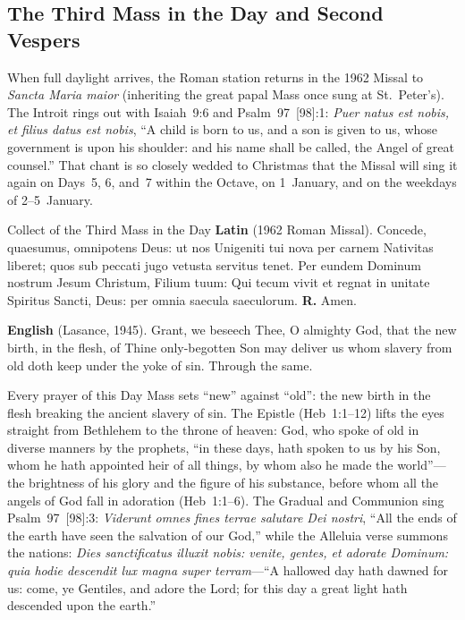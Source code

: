 \subsection{The Third Mass in the Day and Second Vespers}

When full daylight arrives, the Roman station returns in the 1962 Missal to
\textit{Sancta Maria maior} (inheriting the great papal Mass once sung at
St.~Peter's). The Introit rings out with Isaiah~9:6 and Psalm~97~[98]:1:
\textit{Puer natus est nobis, et filius datus est nobis}, ``A child is born to
us, and a son is given to us, whose government is upon his shoulder: and his
name shall be called, the Angel of great counsel.'' That chant is so closely
wedded to Christmas that the Missal will sing it again on Days~5, 6, and~7
within the Octave, on 1~January, and on the weekdays of 2--5~January.

\begin{massbox}{Collect of the Third Mass in the Day}
\textbf{Latin} (1962 Roman Missal). Concede, quaesumus, omnipotens Deus: ut nos
Unigeniti tui nova per carnem Nativitas liberet; quos sub peccati jugo vetusta
servitus tenet. Per eundem Dominum nostrum Jesum Christum, Filium tuum: Qui
tecum vivit et regnat in unitate Spiritus Sancti, Deus: per omnia saecula
saeculorum. \textbf{R.} Amen.

\textbf{English} (Lasance, 1945). Grant, we beseech Thee, O almighty God, that
the new birth, in the flesh, of Thine only-begotten Son may deliver us whom
slavery from old doth keep under the yoke of sin. Through the same.
\end{massbox}

Every prayer of this Day Mass sets ``new'' against ``old'': the new birth in the
flesh breaking the ancient slavery of sin. The Epistle (Heb~1:1--12) lifts the
eyes straight from Bethlehem to the throne of heaven: God, who spoke of old in
diverse manners by the prophets, ``in these days, hath spoken to us by his Son,
whom he hath appointed heir of all things, by whom also he made the world''---the
brightness of his glory and the figure of his substance, before whom all the
angels of God fall in adoration (Heb~1:1--6). The Gradual and Communion sing
Psalm~97~[98]:3: \textit{Viderunt omnes fines terrae salutare Dei nostri}, ``All
the ends of the earth have seen the salvation of our God,'' while the Alleluia
verse summons the nations: \textit{Dies sanctificatus illuxit nobis: venite,
gentes, et adorate Dominum: quia hodie descendit lux magna super terram}---``A
hallowed day hath dawned for us: come, ye Gentiles, and adore the Lord; for this
day a great light hath descended upon the earth.''


